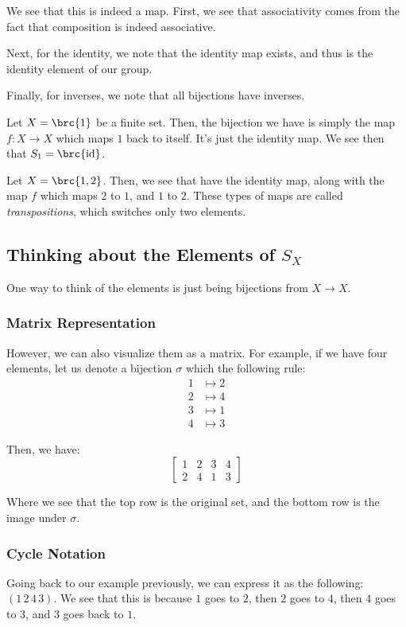\documentclass[openany]{book}
\begin{document}
We see that this is indeed a map. First, we see that associativity comes from the fact that composition is indeed associative.

Next, for the identity, we note that the identity map exists, and thus is the identity element of our group.

Finally, for inverses, we note that all bijections have inverses.

\begin{example}
	Let $X = \brc{1}$ be a finite set. Then, the bijection we have is simply the map $f : X \rightarrow X$ which maps $1$ back to itself. It's just the identity map. We see then that $S_1 = \brc{\mathrm{id}}$.
	
	Let $X = \brc{1, 2}$. Then, we see that have the identity map, along with the map $f$ which maps $2$ to $1$, and $1$ to $2$. These types of maps are called \textit{transpositions}, which switches only two elements.
\end{example}

\subsection{Thinking about the Elements of $S_X$}
One way to think of the elements is just being bijections from $X \rightarrow X$.

\subsubsection{Matrix Representation}
However, we can also visualize them as a matrix. For example, if we have four elements, let us denote a bijection $\sigma$ which the following rule:
\begin{align*}
	1 &\mapsto 2 \\
	2 & \mapsto 4 \\
	3 & \mapsto 1 \\
	4 &\mapsto 3
\end{align*}

Then, we have:
\begin{equation*}
	\begin{bmatrix}
		1 & 2 & 3 & 4 \\
		2 & 4 & 1 & 3
	\end{bmatrix}
\end{equation*}

Where we see that the top row is the original set, and the bottom row is the image under $\sigma$.

\subsubsection{Cycle Notation}
Going back to our example previously, we can express it as the following: $(1 \, 2 \, 4 \, 3)$. We see that this is because $1$ goes to $2$, then $2$ goes to $4$, then $4$ goes to $3$, and $3$ goes back to $1$.
\end{document}
